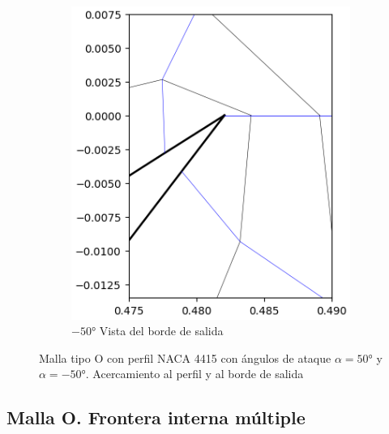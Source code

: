 \documentclass[letterpaper, openright, 12pt]{book}
\begin{document}
\begin{figure}[htbp!]
\begin{subfigure}[b]{0.40\textwidth}
            \includegraphics[keepaspectratio,
                width=1.02\textwidth]{./img/naca4415_-50_close}
            \caption{$-50\si{\degree}$ Vista del borde de salida}
            \label{fig:naca4415_-50_close}
        \end{subfigure}
        \caption[Malla tipo O con perfil NACA 4415 con
            $\alpha = 50\si{\degree}$ y $\alpha = -50\si{\degree}$]{Malla tipo
            O con perfil NACA 4415 con ángulos de ataque
            $\alpha = 50\si{\degree}$ y $\alpha = -50\si{\degree}$.
            Acercamiento al perfil y al borde de salida}
    \end{figure}


    \subsection{Malla O. Frontera interna múltiple}
\end{document}
